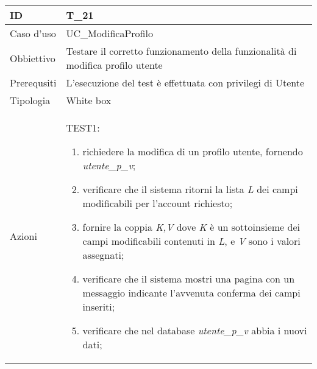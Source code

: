 \begin{table}[hb]
    \centering
    \begin{tabular}{ |p{2cm}|p{10cm}|  }
        \hline
        ID          & T\_21                                                                           \\\hline
        Caso d'uso  & UC\_ModificaProfilo                                                             \\\hline
        Obbiettivo  & Testare il corretto funzionamento della funzionalità di modifica profilo utente \\\hline
        Prerequsiti & L'esecuzione del test è effettuata con privilegi di Utente                      \\\hline
        Tipologia   & White box                                                                       \\\hline
        Azioni      &
        TEST1:
        \begin{enumerate}[nosep, topsep=0pt]
            \item richiedere la modifica di un profilo utente, fornendo \emph{utente\_p\_v};
            \item verificare che il sistema ritorni la lista \emph{L} dei campi modificabili per l'account richiesto;
            \item fornire la coppia \emph{K,V} dove \emph{K} è un sottoinsieme dei campi modificabili contenuti in \emph{L}, e \emph{V} sono i valori assegnati;
            \item verificare che il sistema mostri una pagina con un messaggio indicante l'avvenuta conferma dei campi inseriti;
            \item verificare che nel database \emph{utente\_p\_v} abbia i nuovi dati;
        \end{enumerate}
        \\\hline
    \end{tabular}
\end{table}

